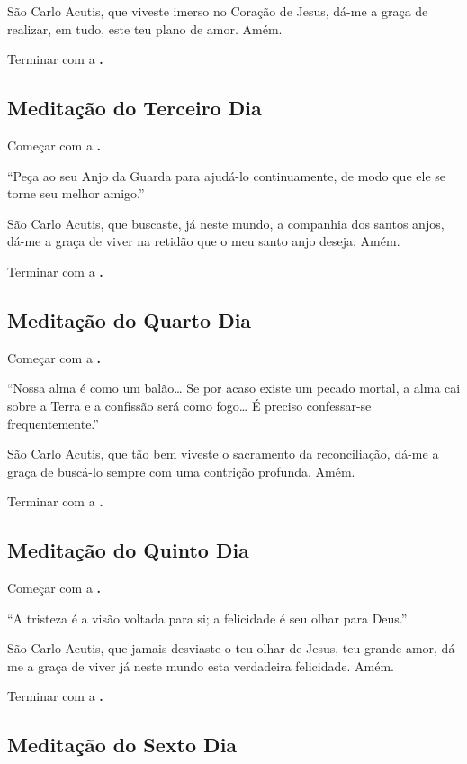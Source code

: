 \documentclass[a4paper,14pt]{extarticle} \usepackage[utf8]{inputenc}
\begin{document}
São Carlo Acutis, que viveste imerso no Coração de Jesus, dá-me a graça de realizar, em tudo, este teu plano de amor. Amém.

Terminar com a \textbf{.}

\subsection{Meditação do Terceiro Dia}

Começar com a \textbf{.}

“Peça ao seu Anjo da Guarda para ajudá-lo continuamente, de modo que ele se torne seu melhor amigo.”

São Carlo Acutis, que buscaste, já neste mundo, a companhia dos santos anjos, dá-me a graça de viver na retidão que o meu santo anjo deseja. Amém.

Terminar com a \textbf{.}

\subsection{Meditação do Quarto Dia}

Começar com a \textbf{.}

“Nossa alma é como um balão… Se por acaso existe um pecado mortal, a alma cai sobre a Terra e a confissão será como fogo… É preciso confessar-se frequentemente.”

São Carlo Acutis, que tão bem viveste o sacramento da reconciliação, dá-me a graça de buscá-lo sempre com uma contrição profunda. Amém.

Terminar com a \textbf{.}

\subsection{Meditação do Quinto Dia}

Começar com a \textbf{.}

“A tristeza é a visão voltada para si; a felicidade é seu olhar para Deus.”

São Carlo Acutis, que jamais desviaste o teu olhar de Jesus, teu grande amor, dá-me a graça de viver já neste mundo esta verdadeira felicidade. Amém.

Terminar com a \textbf{.}

\subsection{Meditação do Sexto Dia}
\end{document}
